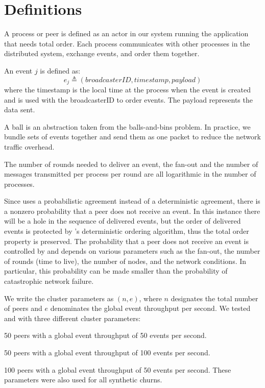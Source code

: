 \section{Definitions}
\label{sec:definitions}
A process or peer is defined as an actor in our system running the application that needs total order. Each process communicates with other processes in the distributed system, exchange events, and order them together.
\par
An event $j$ is defined as: $$e_j \triangleq (broadcasterID,timestamp,payload)$$ where the timestamp is the local time at the process when the event is created and is used with the broadcasterID to order events. The payload represents the data sent.
\par
A ball is an abstraction taken from the balls-and-bins problem. In practice, we bundle sets of events together and send them as one packet to reduce the network traffic overhead.

The number of rounds needed to deliver an event, the fan-out and the number of messages transmitted per process per round are all logarithmic in the number of processes. \autocite{matos2015epto}
\par
Since \epto uses a probabilistic agreement instead of a deterministic agreement, there is a nonzero probability that a peer does not receive an event. In this instance there will be a hole in the sequence of delivered events, but the order of delivered events is protected by \epto's deterministic ordering algorithm, thus the total order property is preserved. The probability that a peer does not receive an event is controlled by \epto and depends on various parameters such as the fan-out, the number of rounds (time to live), the number of nodes, and the network conditions. In particular, this probability can be made smaller than the probability of catastrophic network failure. %
\par
We write the cluster parameters as $(n,e)$, where $n$ designates the total number of peers and $e$ denominates the global event throughput per second. We tested \epto and \jgroups with three different cluster parameters:
\begin{description}[\IEEEsetlabelwidth{$(100,100)$:}]
	\item[\textbf{$(50,50)$}:] 50 peers with a global event throughput of 50 events per second.
	\item[\textbf{$(50,100)$}:] 50 peers with a global event throughput of 100 events per second.
	\item[\textbf{$(100,50)$}:] 100 peers with a global event throughput of 50 events per second. These parameters were also used for all synthetic churns.
\end{description}
